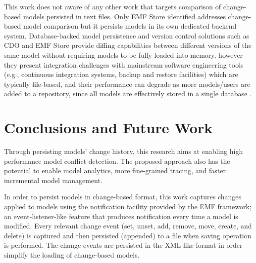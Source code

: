 This work does not aware of any other work that targets comparison of change-based models persisted in text files. Only EMF Store \cite{koegel2010emfstore} identified addresses change-based model comparison but it persists models in its own dedicated backend system. Database-backed model persistence and version control solutions such as CDO \cite{eclipse2019cdo} and EMF Store provide diffing capabilities between different versions of the same model without requiring models to be fully loaded into memory, however they present integration challenges with mainstream software engineering tools (e.g., continuous integration systems, backup and restore facilities) which are typically file-based, and their performance can degrade as more models/users are added to a repository, since all models are effectively stored in a single database \cite{KolovosRMPGCLRV13}. 

\section{Conclusions and Future Work}
\label{sec:conclusions_and_future_work}
Through persisting models' change history, this research aims at enabling high performance model conflict detection. The proposed approach also has the potential to enable model analytics, more fine-grained tracing, and faster incremental model management. 

In order to persist models in change-based format, this work captures changes applied to models using the notification facility provided by the EMF framework; an event-listener-like feature that produces notification every time a model is modified. Every relevant change event (set, unset, add, remove, move, create, and delete) is captured and then persisted (appended) to a file when saving operation is performed. The change events are persisted in the XML-like format in order simplify the loading of change-based models. 

